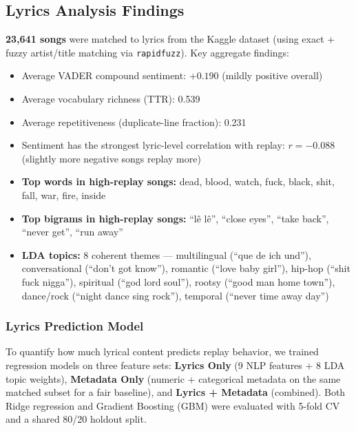 \documentclass[11pt, letterpaper]{article}
\begin{document}
\subsection{Lyrics Analysis Findings}

\textbf{23,641 songs} were matched to lyrics from the Kaggle dataset (using exact + fuzzy artist/title matching via \texttt{rapidfuzz}).
Key aggregate findings:

\begin{itemize}[noitemsep]
    \item Average VADER compound sentiment: $+0.190$ (mildly positive overall)
    \item Average vocabulary richness (TTR): 0.539
    \item Average repetitiveness (duplicate-line fraction): 0.231
    \item Sentiment has the strongest lyric-level correlation with replay: $r = -0.088$ (slightly more negative songs replay more)
    \item \textbf{Top words in high-replay songs:} dead, blood, watch, fuck, black, shit, fall, war, fire, inside
    \item \textbf{Top bigrams in high-replay songs:} ``lê lê'', ``close eyes'', ``take back'', ``never get'', ``run away''
    \item \textbf{LDA topics:} 8 coherent themes — multilingual (``que de ich und''), conversational (``don't got know''), romantic (``love baby girl''), hip-hop (``shit fuck nigga''), spiritual (``god lord soul''), rootsy (``good man home town''), dance/rock (``night dance sing rock''), temporal (``never time away day'')
\end{itemize}

\subsubsection*{Lyrics Prediction Model}

To quantify how much lyrical content predicts replay behavior, we trained regression models on three feature sets: \textbf{Lyrics Only} (9 NLP features + 8 LDA topic weights), \textbf{Metadata Only} (numeric + categorical metadata on the same matched subset for a fair baseline), and \textbf{Lyrics + Metadata} (combined). Both Ridge regression and Gradient Boosting (GBM) were evaluated with 5-fold CV and a shared 80/20 holdout split.
\end{document}
